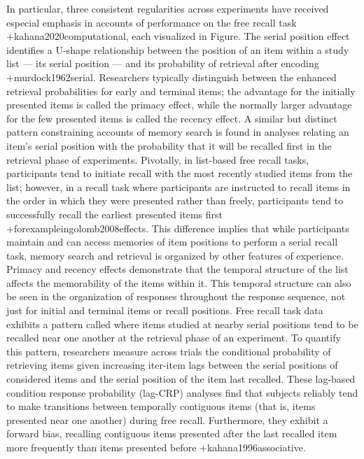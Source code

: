 {}In particular, three consistent regularities across experiments have received especial emphasis in accounts of performance on the free recall task +{}{}{kahana2020computational}, each visualized in Figure. The serial position effect identifies a U-shape relationship between the position of an item within a study list --- its serial position --- and its probability of retrieval after encoding +{}{}{murdock1962serial}. Researchers typically distinguish between the enhanced retrieval probabilities for early and terminal items; the advantage for the initially presented items is called the primacy effect, while the normally larger advantage for the few presented items is called the recency effect.\markdownRendererInterblockSeparator
{}A similar but distinct pattern constraining accounts of memory search is found in analyses relating an item's serial position with the probability that it will be recalled first in the retrieval phase of experiments. Pivotally, in list-based free recall tasks, participants tend to initiate recall with the most recently studied items from the list; however, in a  recall task where participants are instructed to recall items in the order in which they were presented rather than freely, participants tend to successfully recall the earliest presented items first +{for\markdownRendererNbsp{}example\markdownRendererNbsp{}in}{}{golomb2008effects}. This difference implies that while participants maintain and can access memories of item positions to perform a serial recall task, memory search and retrieval is organized by other features of experience.\markdownRendererInterblockSeparator
{}Primacy and recency effects demonstrate that the temporal structure of the list affects the memorability of the items within it. This temporal structure can also be seen in the organization of responses throughout the response sequence, not just for initial and terminal items or recall positions. Free recall task data exhibits a pattern called  where items studied at nearby serial positions tend to be recalled near one another at the retrieval phase of an experiment. To quantify this pattern, researchers measure across trials the conditional probability of retrieving items given increasing iter-item lags between the serial positions of considered items and the serial position of the item last recalled. These lag-based condition response probability (lag-CRP) analyses find that subjects reliably tend to make transitions between temporally contiguous items (that is, items presented near one another) during free recall. Furthermore, they exhibit a forward bias, recalling contiguous items presented after the last recalled item more frequently than items presented before +{}{}{kahana1996associative}.\markdownRendererInterblockSeparator
